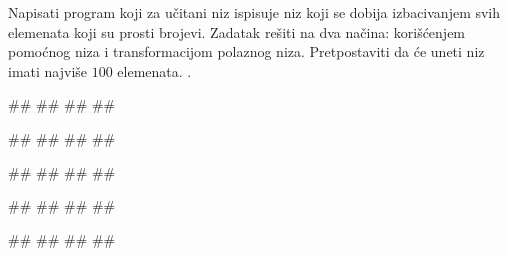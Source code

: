 \begin{Exercise}[label=p.izbacivanje_prostih_elemenata] 
Napisati program koji za učitani niz ispisuje niz koji se dobija izbacivanjem svih elemenata koji su prosti brojevi. Zadatak rešiti na dva načina: korišćenjem pomoćnog niza i transformacijom polaznog niza. %
Pretpostaviti da će uneti niz imati najviše $100$ elemenata. 
. 

 
\begin{miditest}
\begin{upotreba}{1}
#\naslovInt#
##
##
##
\end{upotreba}
\end{miditest}
\begin{miditest}
\begin{upotreba}{2}
#\naslovInt#
##
##
##
\end{upotreba}
\end{miditest}

\begin{miditest}
\begin{upotreba}{3}
#\naslovInt#
##
##
##
\end{upotreba}
\end{miditest}
\begin{miditest}
\begin{upotreba}{4}
#\naslovInt#
##
##
#\izlaz{}#
\end{upotreba}
\end{miditest}

\begin{miditest}
\begin{upotreba}{5}
#\naslovInt#
##
##
##
\end{upotreba}
\end{miditest}
\end{Exercise}

